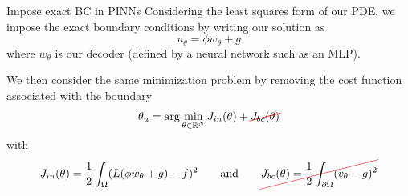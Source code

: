 \begin{frame}{Impose exact BC in PINNs}
	Considering the least squares form of our PDE, we impose the exact boundary conditions by writing our solution as
	\begin{equation*}
		u_\theta=\phi w_\theta + g
	\end{equation*}
	where $w_\theta$ is our decoder (defined by a neural network such as an MLP).
	
	We then consider the same minimization problem by removing the cost function associated with the boundary
	\begin{equation*}
		\theta_u=\arg\min_{\theta\in\mathbb{R}^N} J_{in}(\theta)+\Ccancel[red]{J_{bc}(\theta)}
	\end{equation*}
	with 
	\begin{equation*}
		J_{in}(\theta)=\frac{1}{2}\int_\Omega (L(\phi w_\theta + g) - f)^2  \qquad \text{and} \qquad \Ccancel[red]{J_{bc}(\theta)=\frac{1}{2}\int_{\partial\Omega} (v_\theta-g)^2}
	\end{equation*}	
\end{frame}

